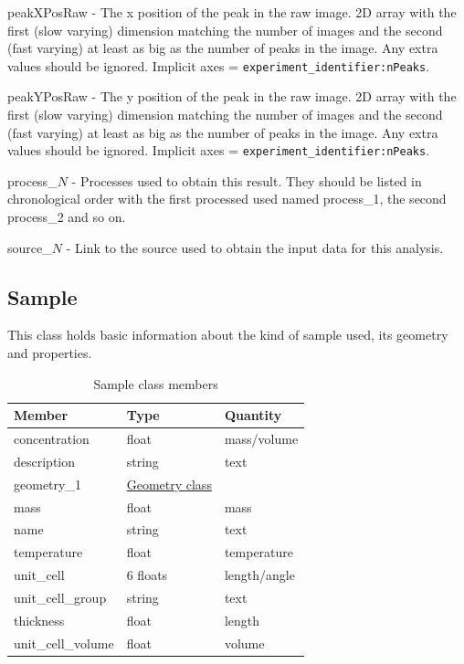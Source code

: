 \documentclass[usletter,11pt]{article}
\newcommand{\member}[2]
{ \noindent
{ \color{softBlue}  #1 - } #2
\vspace{0.2cm}
}
\begin{document}
\member{peakXPosRaw}{The x position of the peak in the raw image. 2D array with the
  first (slow varying) dimension matching the number of images and the second
  (fast varying) at least as big as the number of peaks in
  the image. Any extra values should be ignored. Implicit axes = {\tt experiment\_identifier:nPeaks}.}

\member{peakYPosRaw}{The y position of the peak in the raw image. 2D array with the
  first (slow varying) dimension matching the number of images and the second
  (fast varying) at least as big as the number of peaks in
  the image. Any extra values should be ignored. Implicit axes = {\tt experiment\_identifier:nPeaks}.}

\member{process\_$N$}{Processes used to obtain this result. They should
be listed in chronological order with the first processed used named
process\_1, the second process\_2 and so on.}

\member{source\_$N$}{Link to the source used to obtain the input data for this analysis.}

\subsection{Sample}
\label{table:sample}

This class holds basic information about the kind of sample used, its
geometry and properties.

\begin{table}[h!]\sffamily \footnotesize
\caption{Sample class members}

\begin{tabular}{p{4.5cm} p{4.5cm}  p{2.5cm} }
\toprule
\bfseries Member     & \bfseries Type & \bfseries Quantity \\
\midrule
concentration & float & mass/volume \\
description & string & text \\
geometry\_1 &  \hyperref[table:geometry]{Geometry class} & \\
mass & float & mass \\
name & string & text \\
temperature     & float & temperature  \\
unit\_cell & 6 floats & length/angle \\
unit\_cell\_group & string & text \\
thickness & float & length \\
unit\_cell\_volume & float & volume \\
\bottomrule
\end{tabular}
\end{table}
\end{document}
